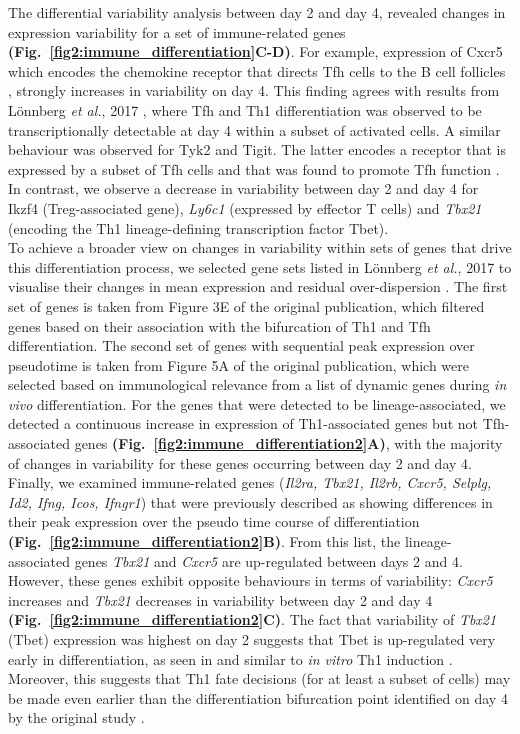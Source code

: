 The differential variability analysis between day 2 and day 4, revealed  changes in expression variability for a set of immune-related genes \textbf{(Fig.~\ref{fig2:immune_differentiation}C-D)}. For example, expression of \gls{Cxcr5} which encodes the chemokine receptor that directs Tfh cells to the B cell follicles \citep{Crotty2014}, strongly increases in variability on day 4. This finding agrees with results from L\"onnberg \emph{et al.}, 2017 \citep{Lonnberg2017}, where Tfh and Th1 differentiation was observed to be transcriptionally detectable at day 4 within a subset of activated cells. A similar behaviour was observed for \gls{Tyk2} and \gls{Tigit}. The latter encodes a receptor that is expressed by a subset of Tfh cells and that was found to promote Tfh function \citep{Godefroy2015}. In contrast, we observe a decrease in variability between day 2 and day 4 for \gls{Ikzf4} (Treg-associated gene), \textit{Ly6c1} (expressed by effector T cells) and \textit{Tbx21} (encoding the Th1 lineage-defining transcription factor Tbet). \\

To achieve a broader view on changes in variability within sets of genes that drive this differentiation process, we selected gene sets listed in L\"onnberg \emph{et al.}, 2017 to visualise their changes in mean expression and residual over-dispersion \citep{Lonnberg2017}. The first set of genes is taken from Figure 3E of the original publication, which filtered genes based on their association with the bifurcation of Th1 and Tfh differentiation. The second set of genes with sequential peak expression over pseudotime is taken from Figure 5A of the original publication, which were selected based on immunological relevance from a list of dynamic genes during \textit{in vivo} differentiation. For the genes that were detected to be lineage-associated, we detected a continuous increase in expression of Th1-associated genes but not Tfh-associated genes \textbf{(Fig.~\ref{fig2:immune_differentiation2}A)}, with the majority of changes in variability for these genes occurring between day 2 and day 4. \\

Finally, we examined immune-related genes (\textit{Il2ra, Tbx21, Il2rb, Cxcr5, Selplg, Id2, Ifng, Icos, Ifngr1}) that were previously described as showing differences in their peak expression over the pseudo time course of differentiation \citep{Lonnberg2017} \textbf{(Fig.~\ref{fig2:immune_differentiation2}B)}. From this list, the lineage-associated genes \textit{Tbx21} and \textit{Cxcr5} are up-regulated between days 2 and 4. However, these genes  exhibit opposite behaviours in terms of variability: \textit{Cxcr5} increases and \textit{Tbx21} decreases in variability between day 2 and day 4 \textbf{(Fig.~\ref{fig2:immune_differentiation2}C)}. The fact that variability of \textit{Tbx21} (Tbet) expression was highest on day 2 suggests that Tbet is up-regulated very early in differentiation, as seen in \cite{Lonnberg2017} and similar to \textit{in vitro} Th1 induction \citep{Szabo2000}. Moreover, this suggests that Th1 fate decisions (for at least a subset of cells) may be made even earlier than the differentiation bifurcation point identified on day 4 by the original study \citep{Lonnberg2017}. 

